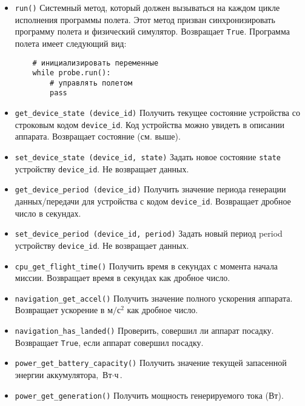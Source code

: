 \documentclass[12pt,a4paper]{article}
\begin{document}
\begin{itemize}
\item \verb'run()' Системный метод, который должен вызываться на каждом цикле исполнения
  программы полета. Этот метод призван синхронизировать программу полета и физический
  симулятор. Возвращает \verb'True'. Программа полета имеет следующий вид:
\begin{verbatim}
    # инициализировать переменные
    while probe.run(): 
        # управлять полетом
        pass
\end{verbatim}

\item \verb'get_device_state (device_id)' Получить текущее состояние устройства со
  строковым кодом \verb'device_id'. Код устройства можно увидеть в описании
  аппарата. Возвращает состояние (см. выше).
  
\item \verb'set_device_state (device_id, state)' Задать новое состояние \verb'state'
  устройству \verb'device_id'. Не возвращает данных.

\item  \verb'get_device_period (device_id)' Получить значение периода генерации
  данных/передачи для устройства с кодом \verb'device_id'. Возвращает дробное число в
  секундах.
  
\item  \verb'set_device_period (device_id, period)' Задать новый период period устройству
  \verb'device_id'. Не возвращает данных.
  
\item \verb'cpu_get_flight_time()' Получить время в секундах с момента начала
  миссии. Возвращает время в секундах как дробное число.
  
\item \verb'navigation_get_accel()' Получить значение полного ускорения
  аппарата. Возвращает ускорение в $\text{м}/\text{с}^2$ как дробное число.
  
\item \verb'navigation_has_landed()' Проверить, совершил ли аппарат посадку. Возвращает
\verb'True', если аппарат совершил посадку.

\item \verb'power_get_battery_capacity()' Получить значение текущей запасенной энергии
  аккумулятора, $\text{Вт} \cdot \text{ч}$.
  
\item \verb'power_get_generation()' Получить мощность генерируемого тока (Вт).


\end{itemize}
\end{document}
